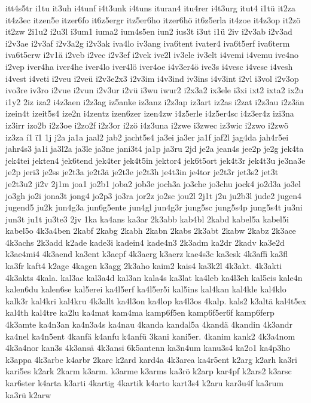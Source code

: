 {itt4s5tr
i1tu
it3uh
i4tunf
i4t3unk
i4tuns
ituran4
itu4rer
i4t3urg
itut4
i1tü
it2za
it4z3ec
itzen5e
itzer6fo
it6z5ergr
itz5er6ho
itzer6hö
it6z5erla
it4zoe
it4z3op
it2zö
it2zw
2i1u2
i2u3l
i3um1
iuma2
ium4s5en
iun2
ius3t
i3ut
i1ü
2iv
i2v3ab
i2v3ad
i2v3ae
i2v3af
i2v3a2g
i2v3ak
iva4lo
iv3ang
iva6tent
ivater4
iva6t5erf
iva6term
iva6t5erw
i2v1ä
i2veb
i2vec
i2v3ef
i2vek
ive2l
iv3ele
iv3elt
i4vemi
i4vemu
ive4no
i2vep
iver4ha
iver4he
iver4lo
iver4lö
iver4oe
i4v3er4ö
ive3s
i4vesc
i4vese
i4vesh
i4vest
i4veti
i2veu
i2veü
i2v3e2x3
i2v3im
i4v3ind
iv3ins
i4v3int
i2vl
i3vol
i2v3op
ivo3re
iv3ro
i2vue
i2vun
i2v3ur
i2vü
i3wu
iwur2
i2x3a2
ix3ele
i3xi
ixt2
ixta2
ix2u
i1y2
2iz
iza2
i4z3aen
i2z3ag
iz5anke
iz3anz
i2z3ap
iz3art
iz2as
i2zat
i2z3au
i2z3än
izein4t
izeit5s4
ize2n
i4zentz
izen6zer
izen4zw
i4z5erle
i4z5er4sc
i4z3er4z
izi3na
iz3irr
izo2b
i2z3oe
i2zo2f
i2z3or
i2zö
i4z3una
i2zwe
i3zwec
iz3wic
i2zwo
i2zwö
iz3za
í1
ï1
1j
j2a
ja1a
jaal2
jab2
jacht5s4
ja3ei
ja3er
ja1f
jaf2l
jag4da
jah4r5ei
jahr4s3
ja1i
ja3l2a
ja3le
ja3ne
jani3t4
ja1p
ja3ru
2jd
je2a
jean4s
jee2p
je2g
jek4ta
jek4tei
jekten4
jek6tend
jek4ter
jek4t5in
jektor4
jek6t5ort
jek4t3r
jek4t3u
je3na3e
je2p
jeri3
je2ss
je2t3a
je2t3ä
je2t3e
je2t3h
je4t3in
je4tor
je2t3r
jet3s2
jet3t
je2t3u2
ji2v
2j1m
joa1
jo2b1
joba2
job3e
joch3a
jo3che
jo3chu
jock4
jo2d3a
jo3el
jo3gh
jo2i
jona3t
jong4
jo2p3
jo3ra
jor2z
jo2sc
jou2l
2j1t
j2u
ju2b3l
jude2
jugen4
jugend5
ju2k
jun4g3a
jun6g5ente
jun4gl
jun4g3r
jung5sc
jung5s4p
jung5s4t
ju3ni
jun3t
ju1t
ju3te3
2jv
1ka
ka4ans
ka3ar
2k3abb
kab4bl
2kabd
kabel5a
kabel5i
kabel5o
4k3a4ben
2kabf
2kabg
2kabh
2kabn
2kabs
2k3abt
2kabw
2kabz
2k3ace
4k3achs
2k3add
k2ade
kade3i
kadein4
kade4n3
2k3adm
ka2dr
2kadv
ka3e2d
k3ae4mi4
4k3aend
ka3ent
k3aepf
4k3aerg
k3aerz
kae4s3c
ka3esk
4k3affi
ka3fl
ka3fr
kaft4
k2age
4kagen
k3agg
2k3aho
kaim2
kais4
ka3k2l
4k3akt.
4k3akti
4k3akts
4kala.
kal3ac
kal3a4d
kal3an
kala4s
ka3lat
ka4leb
ka4l3eh
kal5eis
kale4n
kalen6du
kalen6se
kal5erei
ka4l5erf
ka4l5er5i
kal5ins
kal4kan
kal4kle
kal4klo
kalk3r
kal4kri
kal4kru
4k3allt
ka4l3on
ka4lop
ka4l3os
4kalp.
kals2
k3altä
kal4t5ex
kal4th
kal4tre
ka2lu
ka4mat
kam4ma
kamp6f5en
kamp6f5er6f
kamp6ferp
4k3amte
ka4n3an
ka4n3a4s
ka4nau
4kanda
kandal5a
4kandä
4kandin
4k3andr
ka4nel
ka4n5ent
4kanfä
k4anfu
k4anfü
3kani
kani5er.
4kanim
kank2
4k3a4nom
4k3a4nor
kan3s
4k3ansä
4k3ansi
6k5antenn
ka3n4um
kanu3s4
ka2o1
ka4p3ho
k3appa
4k3arbe
k4arbr
2karc
k2ard
kard4a
4k3area
ka4r5ent
k2arg
k2arh
ka3ri
kari5es
k2ark
2karm
k3arm.
k3arme
k3arms
ka3rö
k2arp
kar4pf
k2ars2
k3arsc
kar6ster
k4arta
k3arti
4kartig
4kartik
k4arto
kart3s4
k2aru
kar3u4f
ka3rum
ka3rü
k2arw
}
